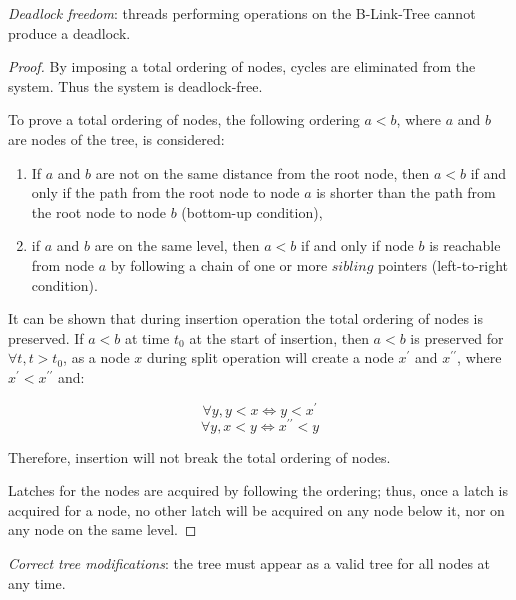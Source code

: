 \begin{theorem}
  \textit{Deadlock freedom}: threads performing operations on the B-Link-Tree cannot produce a deadlock.
\end{theorem}

\begin{proof}
  By imposing a total ordering of nodes, cycles are eliminated from the system. Thus the system is deadlock-free.

  To prove a total ordering of nodes, the following ordering $a < b$, where $a$ and $b$ are nodes of the tree, is considered:

  \begin{enumerate}
    \item If $a$ and $b$ are not on the same distance from the root node, then $a < b$ if and only if the path from the root node to node $a$ is shorter than the path from the root node to node $b$ (bottom-up condition),
    \item if $a$ and $b$ are on the same level, then $a < b$ if and only if node $b$ is reachable from node $a$ by following a chain of one or more $sibling$ pointers (left-to-right condition).
  \end{enumerate}

  It can be shown that during insertion operation the total ordering of nodes is preserved. If $a < b$ at time $t_0$ at the start of insertion, then $a < b$ is preserved for $\forall t, t > t_0$, as a node $x$ during split operation will create a node $x^\prime$ and $x^{\prime\prime}$, where $x^\prime < x^{\prime\prime}$ and:

  $$\forall y, y < x \Leftrightarrow y < x^\prime$$
  $$\forall y, x < y \Leftrightarrow x^{\prime\prime} < y$$

  Therefore, insertion will not break the total ordering of nodes.

  Latches for the nodes are acquired by following the ordering; thus, once a latch is acquired for a node, no other latch will be acquired on any node below it, nor on any node on the same level.
\end{proof}

\begin{theorem}\label{theorem:b-link-tree:modifications}
  \textit{Correct tree modifications}: the tree must appear as a valid tree for all nodes at any time.
\end{theorem}


